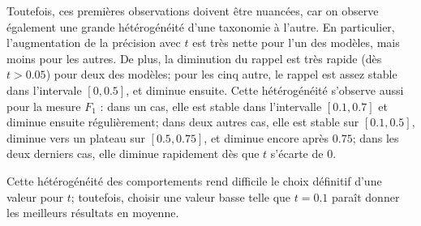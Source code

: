 Toutefois, ces premières observations doivent être nuancées, car on observe également une grande hétérogénéité d'une taxonomie à l'autre. En particulier, l'augmentation de la précision avec $t$ est très nette pour l'un des modèles, mais moins pour les autres. De plus, la diminution du rappel est très rapide (dès $t > 0.05$) pour deux des modèles; pour les cinq autre, le rappel est assez stable dans l'intervale $[0, 0.5]$, et diminue ensuite. Cette hétérogénéité s'observe aussi pour la mesure $F_1$ : dans un cas, elle est stable dans l'intervalle $[0.1, 0.7]$ et diminue ensuite régulièrement; dans deux autres cas, elle est stable sur $[0.1, 0.5]$, diminue vers un plateau sur $[0.5, 0.75]$, et diminue encore après $0.75$; dans les deux derniers cas, elle diminue rapidement dès que $t$ s'écarte de $0$.

Cette hétérogénéité des comportements rend difficile le choix définitif d'une valeur pour $t$; toutefois, choisir une valeur basse telle que $t = 0.1$ paraît donner les meilleurs résultats en moyenne.



